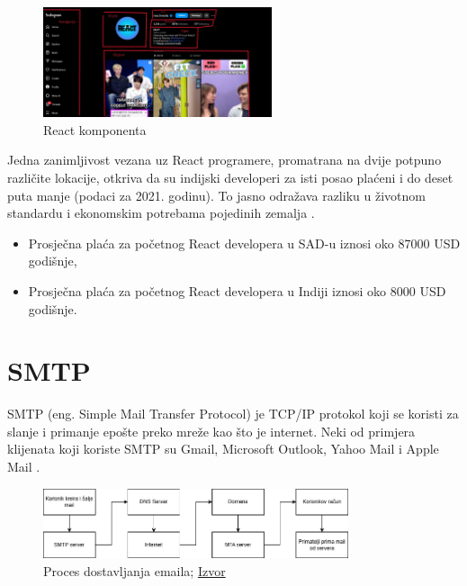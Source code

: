 \documentclass[]{foi}
\begin{document}
\begin{figure}[ht!]
    \centering
    \includegraphics[width=0.6\textwidth]{./assets/components.png} 
    \caption{React komponenta}
    \label{fig:slika5}
\end{figure}


Jedna zanimljivost vezana uz React programere, promatrana na dvije potpuno različite lokacije, otkriva da su indijski developeri za isti posao plaćeni i do deset puta manje (podaci za 2021. godinu). 
To jasno odražava razliku u životnom standardu i ekonomskim potrebama pojedinih zemalja \cite{simplilearn2025react}.
\begin{itemize}
    \item Prosječna plaća za početnog React developera u SAD-u iznosi oko 87000 USD godišnje,
    \item Prosječna plaća za početnog React developera u Indiji iznosi oko 8000 USD godišnje.
\end{itemize}

\section{SMTP}
SMTP (eng. Simple Mail Transfer Protocol) je TCP/IP protokol koji se koristi za slanje i primanje epošte preko mreže kao što je internet.
Neki od primjera klijenata koji koriste SMTP su Gmail, Microsoft Outlook, Yahoo Mail i Apple Mail \cite{gillisSMTP}. 

\begin{figure}[ht!]
    \centering
    \includegraphics[width=0.8\textwidth]{./assets/Proces dostavljanja emaila.png} 
    \caption{Proces dostavljanja emaila; \href{https://www.techtarget.com/rms/onlineimages/email_delivery_process-f.png}{Izvor}}
    \label{fig:slika17}
\end{figure}
\end{document}
